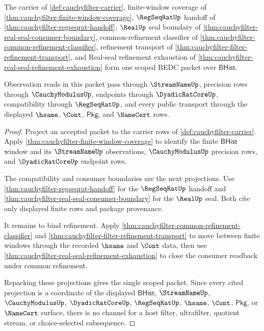 \begin{theorem}\label{thm:cauchyfilter-scoped-dependency-packet}
The carrier of \autoref{def:cauchyfilter-carrier}, finite-window coverage of
\autoref{thm:cauchyfilter-finite-window-coverage}, $\RegSeqRatUp$ handoff of
\autoref{thm:cauchyfilter-regseqrat-handoff}, $\RealUp$ seal boundary of
\autoref{thm:cauchyfilter-real-seal-consumer-boundary}, common-refinement
classifier of \autoref{thm:cauchyfilter-common-refinement-classifier},
refinement transport of \autoref{thm:cauchyfilter-filter-refinement-transport},
and Real-seal refinement exhaustion of
\autoref{thm:cauchyfilter-real-seal-refinement-exhaustion} form one scoped
BEDC packet over $\mathsf{BHist}$.

Observation reads in this packet pass through $\StreamNameUp$, precision rows
through $\CauchyModulusUp$, endpoints through $\DyadicRatCoreUp$, compatibility
through $\RegSeqRatUp$, and every public transport through the displayed
$\hsame$, $\Cont$, $\mathsf{Pkg}$, and $\NameCert$ rows.
\end{theorem}
\begin{proof}
Project an accepted packet to the carrier rows of
\autoref{def:cauchyfilter-carrier}. Apply
\autoref{thm:cauchyfilter-finite-window-coverage} to identify the finite
$\mathsf{BHist}$ window and its $\StreamNameUp$ observations,
$\CauchyModulusUp$ precision rows, and $\DyadicRatCoreUp$ endpoint rows.

The compatibility and consumer boundaries are the next projections. Use
\autoref{thm:cauchyfilter-regseqrat-handoff} for the $\RegSeqRatUp$ handoff and
\autoref{thm:cauchyfilter-real-seal-consumer-boundary} for the $\RealUp$ seal.
Both cite only displayed finite rows and package provenance.

It remains to bind refinement. Apply
\autoref{thm:cauchyfilter-common-refinement-classifier} and
\autoref{thm:cauchyfilter-filter-refinement-transport} to move between finite
windows through the recorded $\hsame$ and $\Cont$ data, then use
\autoref{thm:cauchyfilter-real-seal-refinement-exhaustion} to close the
consumer readback under common refinement.

Repacking these projections gives the single scoped packet. Since every cited
projection is a coordinate of the displayed $\mathsf{BHist}$,
$\StreamNameUp$, $\CauchyModulusUp$, $\DyadicRatCoreUp$, $\RegSeqRatUp$,
$\hsame$, $\Cont$, $\mathsf{Pkg}$, or $\NameCert$ surface, there is no channel
for a host filter, ultrafilter, quotient stream, or choice-selected
subsequence.
\end{proof}

